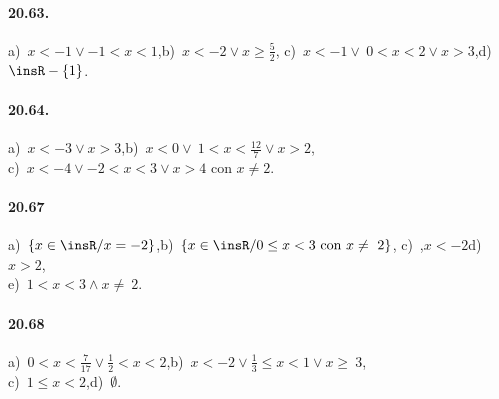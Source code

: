\paragraph{20.63.} a)~$x<-1\vee -1<x<1$,\quad b)~$x<-2\vee x\ge \frac{5}{2}$,\quad
c)~$x<-1\vee~0<x<2\vee x>3$,\quad d)~$\insR-\{1\}$.

\paragraph{20.64.} a)~$x<-3\vee x>3$,\quad b)~$x<0\vee~1<x<\frac{12}{7}\vee x>2$,\quad
\protect\\ c)~$x<-4\vee -2<x<3\vee x>4\text{ con }x\neq2$.

\paragraph{20.67} a)~$\left\{x\in\insR/x=-2\right\}$,\quad b)~$\left\{x\in \insR/0\le x<3\text{ con }x\neq~2\right\}$,\quad
c)~,$x<-2$\quad d)~$x>2$,\quad
\protect\\ e)~$1<x<3\wedge x\neq~2$.

\paragraph{20.68} a)~$0<x<\frac{7}{17}\vee\frac{1}{2}<x<2$,\quad b)~$x<-2\vee \frac{1}{3}\le x<1\vee x\ge~3$,\quad
\protect\\ c)~$1\le x<2$,\quad d)~$\emptyset $.
